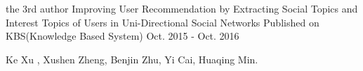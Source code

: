 
\begin{cventries}
  \cventry
    {the 3rd author}
    {Improving User Recommendation by Extracting Social Topics and Interest Topics of Users in Uni-Directional Social Networks}
    {Published on KBS(Knowledge Based System)}
    {Oct. 2015 - Oct. 2016}
    {
      \begin{cvitems}
        \item {Ke Xu , Xushen Zheng, Benjin Zhu, Yi Cai, Huaqing Min.}
      \end{cvitems}
    }
\end{cventries}
